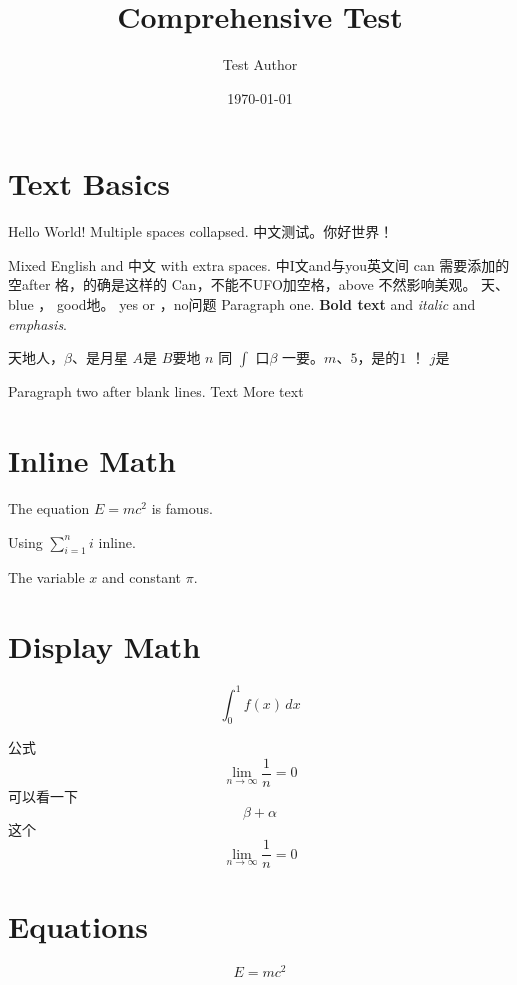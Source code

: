 \documentclass{article}
\title{Comprehensive Test}
\author{Test Author}
\date{\today}
\begin{document}
\maketitle

\section{Text Basics}

Hello   World!   Multiple   spaces   collapsed.
中文测试。你好世界！

Mixed English      and     中文   with   extra   spaces.
中I文and与you英文间 can 需要添加的空after 格，的确是这样的 Can，不能不UFO加空格，above     不然影响美观。
天、    blue ， good地。 yes or    ，no问题
Paragraph one.
\textbf{Bold text} and \textit{italic} and \emph{emphasis}.

天地人，$\beta$、是月星 $A$是 $B$要地  $n$  同    $\int$ 口$\beta$   一要。$m$、$5$，是的$1$ ！   $j$是



Paragraph two after blank lines.
Text %
More text

\section{Inline Math}
The equation $E = mc^2$ is famous.

Using \( \sum_{i=1}^{n} i \) inline.

The variable $x$ and constant $\pi$.

\section{Display Math}

\[
\int_0^1 f(x) \, dx
\]





公式 $$ \lim_{n \to \infty} \frac{1}{n} = 0 $$可以看一下    $$\beta+\alpha$$这个$$ \lim_{n \to \infty} \frac{1}{n} = 0 $$




\section{Equations}

\begin{equation}
E = mc^2
\end{equation}
\end{document}
